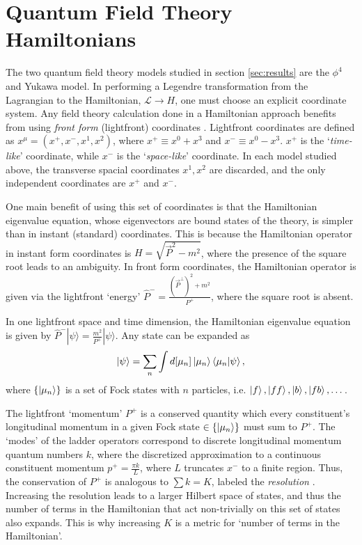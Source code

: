 \section{Quantum Field Theory Hamiltonians}
\label{subsec:qft-hamiltonians}

The two quantum field theory models studied in section \ref{sec:results} are the $\phi^4$ and Yukawa model.
In performing a Legendre transformation from the Lagrangian to the Hamiltonian, $\mathcal{L} \rightarrow H$, one must choose an explicit coordinate system.
Any field theory calculation done in a Hamiltonian approach benefits from using \textit{front form} (lightfront) coordinates \cite{Dirac1949}.
Lightfront coordinates are defined as $x^\mu = \left(x^+, x^-, x^1, x^2 \right)$, where $x^+ \equiv x^0 + x^3$ and $x^- \equiv x^0 - x^3$.
$x^+$ is the `\textit{time-like}' coordinate, while $x^-$ is the `\textit{space-like}' coordinate.
In each model studied above, the transverse spacial coordinates $x^1, x^2$ are discarded, and the only independent coordinates are $x^+$ and $x^-$.

One main benefit of using this set of coordinates is that the Hamiltonian eigenvalue equation, whose eigenvectors are bound states of the theory, is simpler than in instant (standard) coordinates.
This is because the Hamiltonian operator in instant form coordinates is $H = \sqrt{\vec{P}^2 - m^2}$, where the presence of the square root leads to an ambiguity.
In front form coordinates, the Hamiltonian operator is given via the lightfront `energy' $\hat P^- = \frac{\left(\vec{P}^\perp\right)^2 + m^2}{P^+}$, where the square root is absent.

In one lightfront space and time dimension, the Hamiltonian eigenvalue equation is given by $\hat P^-|\psi\rangle = \frac{m^2}{P^+}|\psi\rangle$.
Any state can be expanded as $$\ket{\psi} = \sum_n \int d[\mu_n] \ket{\mu_n}\braket{\mu_n}{\psi},$$ where $\{\ket{\mu_n}\}$ is a set of Fock states with $n$ particles, i.e. $\ket{f}, \ket{ff}, \ket{b}, \ket{fb}, \dots$.

The lightfront `momentum' $P^+$ is a conserved quantity which every constituent's longitudinal momentum in a given Fock state $\in \{\ket{\mu_n}\}$ must sum to $P^+$.
The `modes' of the ladder operators correspond to discrete longitudinal momentum quantum numbers $k$, where the discretized approximation to a continuous constituent momentum $p^+ = \frac{\pi k}{L}$, where $L$ truncates $x^-$ to a finite region.
Thus, the conservation of $P^+$ is analogous to $\sum k = K$, labeled the \textit{resolution} \cite{}.
Increasing the resolution leads to a larger Hilbert space of states, and thus the number of terms in the Hamiltonian that act non-trivially on this set of states also expands.
This is why increasing $K$ is a metric for `number of terms in the Hamiltonian'.


